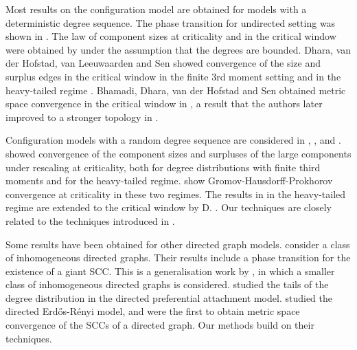 Most results on the configuration model are obtained for models with a deterministic degree sequence. The phase transition for undirected setting was shown in \cite{molloyCriticalPointRandom1995, Molloy1998, Janson2009}. The law of component sizes at criticality and in the critical window were obtained by \citet{Riordan2012} under the assumption that the degrees are bounded. Dhara, van der Hofstad, van Leeuwaarden and Sen showed convergence of the size and surplus edges in the critical window in the finite 3rd moment setting \cite{Dhara2017} and in the heavy-tailed regime \cite{Dhara2020}.  Bhamadi, Dhara, van der Hofstad and Sen obtained metric space convergence in the critical window in \cite{Bhamidi2020}, a result that the authors later improved to a stronger topology in \cite{Bhamidi2020Glmb}. 

Configuration models with a random degree sequence are considered in \cite{josephComponentSizesCritical2014}, \cite{conchon--kerjanStableGraphMetric2020}, and \cite{Donderwinkel2021heightprocess}. \citet{josephComponentSizesCritical2014} showed convergence of the component sizes and surpluses of the large components under rescaling at criticality, both for degree distributions with finite third moments and for the heavy-tailed regime. \citet{conchon--kerjanStableGraphMetric2020} show Gromov-Hausdorff-Prokhorov convergence at criticality in these two regimes. The results in \cite{conchon--kerjanStableGraphMetric2020} in the heavy-tailed regime are extended to the critical window by D. \cite{Donderwinkel2021heightprocess}. Our techniques are closely related to the techniques introduced in \cite{conchon--kerjanStableGraphMetric2020}. 

Some results have been obtained for other directed graph models. \citet{caoConnectivityGeneralClass2019} consider a class of inhomogeneous directed graphs. Their results include a phase transition for the existence of a giant SCC. This is a generalisation work by \citet{Bloznelis2012}, in which a smaller class of inhomogeneous directed graphs is considered. \citet{Samorodnitsky2016} studied the tails of the degree distribution in the directed preferential attachment model. \citet{goldschmidtScalingLimitCritical2019} studied the directed Erd\H{o}s-R\'enyi model, and were the first to obtain metric space convergence of the SCCs of a directed graph. Our methods build on their techniques.

